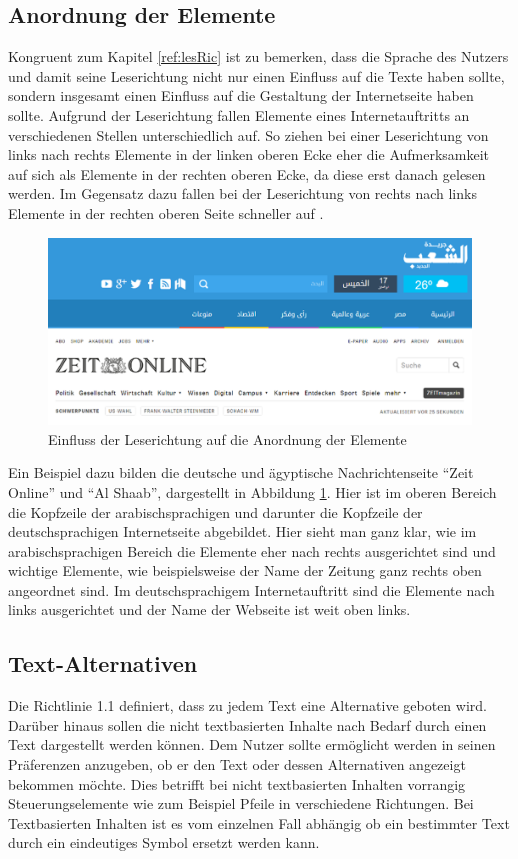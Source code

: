 \documentclass[12pt, paper=a4, bibtotoc, toc=listof, headsepline=true, numbers=endperiod]{scrreprt}
\begin{document}
\subsection{Anordnung der Elemente}
Kongruent zum Kapitel \ref{ref:lesRic} ist zu bemerken, dass die Sprache des Nutzers und damit seine Leserichtung nicht nur einen Einfluss auf die Texte haben sollte, sondern insgesamt einen Einfluss auf die Gestaltung der Internetseite haben sollte. Aufgrund der Leserichtung fallen Elemente eines Internetauftritts an verschiedenen Stellen unterschiedlich auf. So ziehen bei einer Leserichtung von links nach rechts Elemente in der linken oberen Ecke eher die Aufmerksamkeit auf sich als Elemente in der rechten oberen Ecke, da diese erst danach gelesen werden. Im Gegensatz dazu fallen bei der Leserichtung von rechts nach links Elemente in der rechten oberen Seite schneller auf \cite[S.47 f.]{meidl2013global}.
\begin{figure}
	\centering
	\includegraphics[width=\textwidth,height=\textheight,keepaspectratio]{leserichtung.png}
	\caption[Einfluss Leserichtung auf Anordnung der Elemente]{Einfluss der Leserichtung auf die Anordnung der Elemente \cite{elShaab} \cite{zeitOnline}}
	\label{img:lesRic}
\end{figure}\noindent
Ein Beispiel dazu bilden die deutsche und ägyptische Nachrichtenseite \enquote{Zeit Online} und \enquote{Al Shaab}, dargestellt in Abbildung  \ref{img:lesRic}. Hier ist im oberen Bereich die Kopfzeile der arabischsprachigen und darunter die Kopfzeile der deutschsprachigen Internetseite abgebildet. Hier sieht man ganz klar, wie im arabischsprachigen Bereich die Elemente eher nach rechts ausgerichtet sind und wichtige Elemente, wie beispielsweise der Name der Zeitung ganz rechts oben angeordnet sind. Im deutschsprachigem Internetauftritt sind die Elemente nach links ausgerichtet und der Name der Webseite ist weit oben links.
\subsection{Text-Alternativen}
Die Richtlinie 1.1 definiert, dass zu jedem Text eine Alternative geboten wird. Darüber hinaus sollen die nicht textbasierten Inhalte nach Bedarf durch einen Text dargestellt werden können. Dem Nutzer sollte ermöglicht werden in seinen Präferenzen anzugeben, ob er den Text oder dessen Alternativen angezeigt bekommen möchte. Dies betrifft bei nicht textbasierten Inhalten vorrangig Steuerungselemente wie zum Beispiel Pfeile in verschiedene Richtungen. Bei Textbasierten Inhalten ist es vom einzelnen Fall abhängig ob ein bestimmter Text durch ein eindeutiges Symbol ersetzt werden kann.
\end{document}

